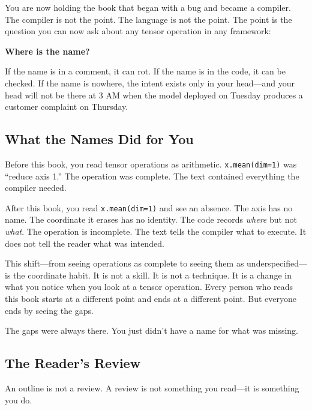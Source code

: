\documentclass[11pt,titlepage]{article}
\begin{document}
\vspace{2em}

You are now holding the book that began with a bug and became a
compiler. The compiler is not the point. The language is not the point.
The point is the question you can now ask about any tensor operation in
any framework:

\textbf{Where is the name?}

If the name is in a comment, it can rot. If the name is in the code, it
can be checked. If the name is nowhere, the intent exists only in your
head---and your head will not be there at 3 AM when the model deployed
on Tuesday produces a customer complaint on Thursday.

\vspace{2em}

\hypertarget{what-the-names-did-for-you}{%
\subsection{What the Names Did for
You}\label{what-the-names-did-for-you}}

Before this book, you read tensor operations as arithmetic.
\texttt{x.mean(dim=1)} was ``reduce axis 1.'' The operation was
complete. The text contained everything the compiler needed.

After this book, you read \texttt{x.mean(dim=1)} and see an absence. The
axis has no name. The coordinate it erases has no identity. The code
records \emph{where} but not \emph{what}. The operation is incomplete.
The text tells the compiler what to execute. It does not tell the reader
what was intended.

This shift---from seeing operations as complete to seeing them as
underspecified---is the coordinate habit. It is not a skill. It is not a
technique. It is a change in what you notice when you look at a tensor
operation. Every person who reads this book starts at a different point
and ends at a different point. But everyone ends by seeing the gaps.

The gaps were always there. You just didn't have a name for what was
missing.

\hypertarget{the-readers-review}{%
\subsection{The Reader's Review}\label{the-readers-review}}

An outline is not a review. A review is not something you read---it is
something you do.
\end{document}
